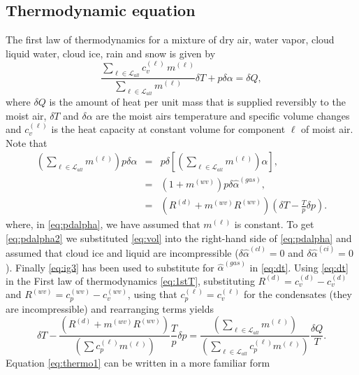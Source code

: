 \documentclass{agujournal}
\begin{document}
{\subsection{Thermodynamic equation}
The first law of thermodynamics for a mixture of dry air, water vapor, cloud liquid water, cloud ice, rain and snow is given by
\begin{equation}
\frac{\sum_{\ell\in \mathcal{L}_{all}} c_{v}^{(\ell)}\, m^{(\ell)}}{\sum_{\ell\in \mathcal{L}_{all}} m^{(\ell)}}\delta T+p\delta \alpha=\delta Q,\label{eq:1stT}
\end{equation}
where $\delta Q$ is the amount of heat per unit mass that is supplied reversibly to the moist air, $\delta T$ and $\delta \alpha$ are the moist airs temperature and specific volume changes and $c_v^{(\ell)}$ is the heat capacity at constant volume for component $\ell$ of moist air. Note that
\begin{eqnarray}
\left( \sum_{\ell \in \mathcal{L}_{all}} m^{(\ell)}\right)p\delta \alpha &=& p \delta \left[ \left( \sum_{\ell \in \mathcal{L}_{all}} m^{(\ell)} \right)\alpha  \right],\label{eq:pdalpha}\\
                                       &=& (1+m^{(wv)})p\delta \hat{\alpha}^{(gas)},\label{eq:pdalpha2}\\
                                       &=& \left(R^{(d)}+m^{(wv)}R^{(wv)}\right)\left(\delta T-\frac{T}{p}\delta p\right)\label{eq:dt}.
\end{eqnarray}
where, in \eqref{eq:pdalpha}, we have assumed that $m^{(\ell)}$ is constant. To get \eqref{eq:pdalpha2} we substituted \eqref{eq:vol} into the right-hand side of \eqref{eq:pdalpha} and assumed that cloud ice and liquid are incompressible ($\delta \hat{\alpha}^{(cl)}=0$ and $\delta \hat{\alpha}^{(ci)}=0$). Finally \eqref{eq:ig3} has been used to substitute for $\hat{\alpha}^{(gas)}$ in \eqref{eq:dt}.
Using \eqref{eq:dt} in the First law of thermodynamics \eqref{eq:1stT}, substituting $R^{(d)}=c_v^{(d)}-c_v^{(d)}$ and $R^{(wv)}=c_p^{(wv)}-c_{v}^{(wv)}$, using that $c_p^{(\ell)}=c^{(\ell)}_v$ for the condensates (they are incompressible) and rearranging terms yields
\begin{equation}
\delta T-\frac{\left(R^{(d)}+m^{(wv)}R^{(wv)}\right)}{\left(\sum c_p^{(\ell)}m^{(\ell)}\right)}\frac{T}{p}\delta p=\frac{\left(\sum_{\ell \in \mathcal{L}_{all}} m^{(\ell)}\right)}{\left(\sum_{\ell \in \mathcal{L}_{all}} c_p^{(\ell)}m^{(\ell)}\right)}\frac{\delta Q}{T}.\label{eq:thermo1}
\end{equation}
Equation \eqref{eq:thermo1} can be written in a more familiar form
}
\end{document}
